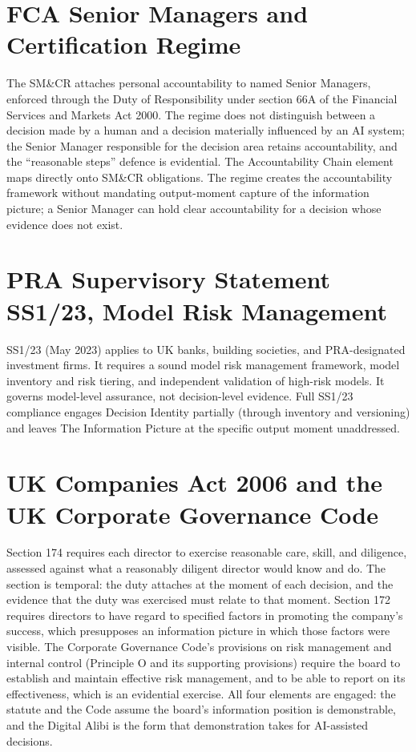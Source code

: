 \section{FCA Senior Managers and Certification Regime}

The SM\&CR attaches personal accountability to named Senior Managers, enforced through the Duty of Responsibility under section 66A of the Financial Services and Markets Act 2000. The regime does not distinguish between a decision made by a human and a decision materially influenced by an AI system; the Senior Manager responsible for the decision area retains accountability, and the ``reasonable steps'' defence is evidential. The Accountability Chain element maps directly onto SM\&CR obligations. The regime creates the accountability framework without mandating output-moment capture of the information picture; a Senior Manager can hold clear accountability for a decision whose evidence does not exist.

\section{PRA Supervisory Statement SS1/23, Model Risk Management}

SS1/23 (May 2023) applies to UK banks, building societies, and PRA-designated investment firms. It requires a sound model risk management framework, model inventory and risk tiering, and independent validation of high-risk models. It governs model-level assurance, not decision-level evidence. Full SS1/23 compliance engages Decision Identity partially (through inventory and versioning) and leaves The Information Picture at the specific output moment unaddressed.

\section{UK Companies Act 2006 and the UK Corporate Governance Code}

Section 174 requires each director to exercise reasonable care, skill, and diligence, assessed against what a reasonably diligent director would know and do. The section is temporal: the duty attaches at the moment of each decision, and the evidence that the duty was exercised must relate to that moment. Section 172 requires directors to have regard to specified factors in promoting the company's success, which presupposes an information picture in which those factors were visible. The Corporate Governance Code's provisions on risk management and internal control (Principle O and its supporting provisions) require the board to establish and maintain effective risk management, and to be able to report on its effectiveness, which is an evidential exercise. All four elements are engaged: the statute and the Code assume the board's information position is demonstrable, and the Digital Alibi is the form that demonstration takes for AI-assisted decisions.

